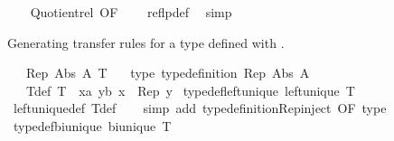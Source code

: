 \begin{isabellebody}
%
\isadelimproof
\ \ %
\endisadelimproof
%
\isatagproof
{}\isamarkupfalse%
\ Quotient{\isacharunderscore}{\kern0pt}rel\ {\isacharbrackleft}{\kern0pt}OF\ {}{\isacharbrackright}{\kern0pt}\ {}\ \isamarkupfalse%
\ reflp{\isacharunderscore}{\kern0pt}def\ \isamarkupfalse%
\ simp%
\endisatagproof
{\isafoldproof}%
%
\isadelimproof
\isanewline
%
\endisadelimproof
\isanewline
{}\isamarkupfalse%
%
\begin{isamarkuptext}%
Generating transfer rules for a type defined with .%
\end{isamarkuptext}\isamarkuptrue%
\isamarkupfalse%
\isanewline
\ \ \ Rep\ Abs\ A\ T\isanewline
\ \ \ type{\isacharcolon}{\kern0pt}\ {\isachardoublequoteopen}type{\isacharunderscore}{\kern0pt}definition\ Rep\ Abs\ A{\isachardoublequoteclose}\isanewline
\ \ \ T{\isacharunderscore}{\kern0pt}def{\isacharcolon}{\kern0pt}\ {\isachardoublequoteopen}T\ {\isasymequiv}\ {\isacharparenleft}{\kern0pt}{\isasymlambda}{\isacharparenleft}{\kern0pt}x{\isacharcolon}{\kern0pt}{\isacharcolon}{\kern0pt}{\isacharprime}{\kern0pt}a{\isacharparenright}{\kern0pt}\ {\isacharparenleft}{\kern0pt}y{\isacharcolon}{\kern0pt}{\isacharcolon}{\kern0pt}{\isacharprime}{\kern0pt}b{\isacharparenright}{\kern0pt}{\isachardot}{\kern0pt}\ x\ {\isacharequal}{\kern0pt}\ Rep\ y{\isacharparenright}{\kern0pt}{\isachardoublequoteclose}\isanewline
{}\isanewline
\isanewline
{}\isamarkupfalse%
\ typedef{\isacharunderscore}{\kern0pt}left{\isacharunderscore}{\kern0pt}unique{\isacharcolon}{\kern0pt}\ {\isachardoublequoteopen}left{\isacharunderscore}{\kern0pt}unique\ T{\isachardoublequoteclose}\isanewline
%
\isadelimproof
\ \ %
\endisadelimproof
%
\isatagproof
{}\isamarkupfalse%
\ left{\isacharunderscore}{\kern0pt}unique{\isacharunderscore}{\kern0pt}def\ T{\isacharunderscore}{\kern0pt}def\isanewline
\ \ \isamarkupfalse%
\ {\isacharparenleft}{\kern0pt}simp\ add{\isacharcolon}{\kern0pt}\ type{\isacharunderscore}{\kern0pt}definition{\isachardot}{\kern0pt}Rep{\isacharunderscore}{\kern0pt}inject\ {\isacharbrackleft}{\kern0pt}OF\ type{\isacharbrackright}{\kern0pt}{\isacharparenright}{\kern0pt}%
\endisatagproof
{\isafoldproof}%
%
\isadelimproof
\isanewline
%
\endisadelimproof
\isanewline
{}\isamarkupfalse%
\ typedef{\isacharunderscore}{\kern0pt}bi{\isacharunderscore}{\kern0pt}unique{\isacharcolon}{\kern0pt}\ {\isachardoublequoteopen}bi{\isacharunderscore}{\kern0pt}unique\ T{\isachardoublequoteclose}\isanewline

\end{isabellebody}
